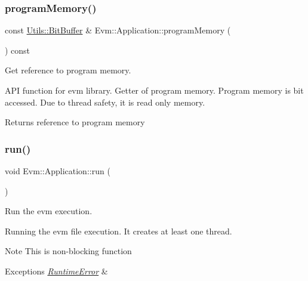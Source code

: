 \subsubsection{\texorpdfstring{program\+Memory()}{programMemory()}}
{\footnotesize\ttfamily const \mbox{\hyperlink{struct_evm_1_1_utils_1_1_bit_buffer}{Utils\+::\+Bit\+Buffer}} \& Evm\+::\+Application\+::program\+Memory (\begin{DoxyParamCaption}{ }\end{DoxyParamCaption}) const}



Get reference to program memory. 

A\+PI function for evm library. Getter of program memory. Program memory is bit accessed. Due to thread safety, it is read only memory. \begin{DoxyReturn}{Returns}
reference to program memory 
\end{DoxyReturn}
\mbox{\label{struct_evm_1_1_application_a26403ae00f2a6d2ef5fa3e78e183f4ce}} 
\subsubsection{\texorpdfstring{run()}{run()}}
{\footnotesize\ttfamily void Evm\+::\+Application\+::run (\begin{DoxyParamCaption}{ }\end{DoxyParamCaption})}



Run the evm execution. 

Running the evm file execution. It creates at least one thread. \begin{DoxyNote}{Note}
This is non-\/blocking function 
\end{DoxyNote}

\begin{DoxyExceptions}{Exceptions}
{\em \mbox{\hyperlink{struct_evm_1_1_runtime_error}{Runtime\+Error}}} & \\
\hline
\end{DoxyExceptions}
\mbox{\label{struct_evm_1_1_application_a4b5883ca11f132aa33ede5a2acd997cc}} 
